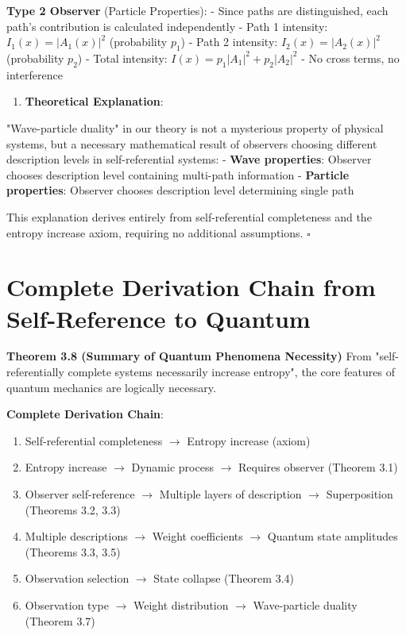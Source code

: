    \textbf{Type 2 Observer} (Particle Properties):
   - Since paths are distinguished, each path's contribution is calculated independently
   - Path 1 intensity: $I_1(x) = |A_1(x)|^2$ (probability $p_1$)
   - Path 2 intensity: $I_2(x) = |A_2(x)|^2$ (probability $p_2$)
   - Total intensity: $I(x) = p_1|A_1|^2 + p_2|A_2|^2$
   - No cross terms, no interference

\begin{enumerate}
\item \textbf{Theoretical Explanation}:
\end{enumerate}
   
   "Wave-particle duality" in our theory is not a mysterious property of physical systems, but a necessary mathematical result of observers choosing different description levels in self-referential systems:
   - \textbf{Wave properties}: Observer chooses description level containing multi-path information
   - \textbf{Particle properties}: Observer chooses description level determining single path
   
   This explanation derives entirely from self-referential completeness and the entropy increase axiom, requiring no additional assumptions. $\square$

\section{Complete Derivation Chain from Self-Reference to Quantum}
\label{sec:ch03_quantum:complete-derivation-chain-from-self-reference-to-quantum}

\textbf{Theorem 3.8 (Summary of Quantum Phenomena Necessity)}
\label{thm:3.8}
From "self-referentially complete systems necessarily increase entropy", the core features of quantum mechanics are logically necessary.

\textbf{Complete Derivation Chain}:
\begin{enumerate}
\item Self-referential completeness $\rightarrow$ Entropy increase (axiom)
\item Entropy increase $\rightarrow$ Dynamic process $\rightarrow$ Requires observer (Theorem 3.1)
\item Observer self-reference $\rightarrow$ Multiple layers of description $\rightarrow$ Superposition (Theorems 3.2, 3.3)
\item Multiple descriptions $\rightarrow$ Weight coefficients $\rightarrow$ Quantum state amplitudes (Theorems 3.3, 3.5)
\item Observation selection $\rightarrow$ State collapse (Theorem 3.4)
\item Observation type $\rightarrow$ Weight distribution $\rightarrow$ Wave-particle duality (Theorem 3.7)
\end{enumerate}

